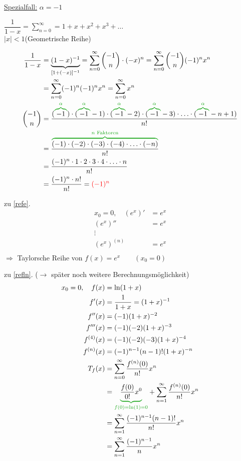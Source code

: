 \begin{enumerate}
	\ul{Spezialfall:} $\alpha = -1$
	
	$\dfrac{1}{1-x}=\sum\limits_{n=0}^{\infty}=1+x+x^2+x^3+\ldots$\\
	\hhfill$|x|<1$\quad(Geometrische Reihe)
	
	\begin{align*}
	\dfrac{1}{1-x}&=\underbrace{(1-x)^{-1}}_{[1+(-x)]^{-1}}=\sum\limits_{n=0}^{\infty}\binom{-1}{n}\cdot(-x)^n=\sum\limits_{n=0}^{\infty}\binom{-1}{n}(-1)^nx^n\\
	&=\sum\limits_{n=0}^{\infty}(-1)^n(-1)^nx^n=\sum\limits_{n=0}^{\infty}x^n\\
	\binom{-1}{n}&=\dfrac{(\greenoverbrace{-1}{\alpha})\cdot(\greenoverbrace{-1}{\alpha}-1)\cdot(\greenoverbrace{-1}{\alpha}-2)\cdot(\greenoverbrace{-1}{\alpha}-3)\cdot\ldots\cdot(\greenoverbrace{-1}{\alpha}-n+1)}{n!}\\
	&=\dfrac{\greenoverbrace{(-1)\cdot(-2)\cdot(-3)\cdot(-4)\cdot\ldots\cdot(-n)}{n\text{ Faktoren}}}{n!}\\
	&=\dfrac{(-1)^n\cdot1\cdot2\cdot3\cdot4\cdot\ldots\cdot n}{n!}\\
	&=\dfrac{(-1)^n\cdot n!}{n!}=\red{(-1)^n}
	\end{align*}
\end{enumerate}

zu \ref{refe}.
\begin{align*}
x_0=0,\quad(e^x)'&=e^x\\
(e^x)''&=e^x\\
\vdots\\
(e^x)^{(n)}&=e^x\\
\end{align*}
$\Rightarrow$ Taylorsche Reihe von $f(x)=e^x\qquad(x_0=0)$

zu \ref{refln}. ($\rightarrow$ später noch weitere Berechnungsmöglichkeit)
\begin{align*}
x_0=0,\quad f(x)&=\ln(1+x)\\
f'(x)&=\dfrac{1}{1+x}=(1+x)^{-1}\\
f''(x)&=(-1)(1+x)^{-2}\\
f'''(x)&=(-1)(-2)(1+x)^{-3}\\
f^{(4)}(x)&=(-1)(-2)(-3)(1+x)^{-4}\\
f^{(n)}(x)&=(-1)^{n-1}(n-1)!(1+x)^{-n}\\
T_f(x)&=\sum\limits_{n=0}^{\infty}\dfrac{f^{(n)}(0)}{n!}x^n\\
&=\greenunderbrace{\dfrac{f(0)}{0!}x^0}{f(0)=\ln(1)=0}+\sum\limits_{n=1}^{\infty}\dfrac{f^{(n)}(0)}{n!}x^n\\
&=\sum\limits_{n=1}^{\infty}\dfrac{(-1)^{n-1}(n-1)!}{n!}x^n\\
&=\sum\limits_{n=1}^{\infty}\dfrac{(-1)^{n-1}}{n}x^n
\end{align*}

